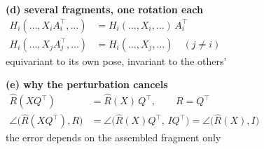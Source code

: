 \documentclass[border=6pt, varwidth=16.2cm]{standalone}
\begin{document}
\vspace{12pt}
\begin{minipage}[t]{7.9cm}\centering
  \textbf{(d) several fragments, one rotation each}\\[8pt]
  {\small $\begin{aligned}
    H_i(\ldots,X_iA_i^{\top},\ldots)&=H_i(\ldots,X_i,\ldots)\,A_i^{\top}\\[2pt]
    H_i(\ldots,X_jA_j^{\top},\ldots)&=H_i(\ldots,X_j,\ldots)\quad(j\ne i)
  \end{aligned}$}\\[5pt]
  {\footnotesize equivariant to its own pose, invariant to the others'}
\end{minipage}\hfill
\begin{minipage}[t]{7.9cm}\centering
  \textbf{(e) why the perturbation cancels}\\[8pt]
  {\small $\begin{aligned}
    \hat R(XQ^{\top})&=\hat R(X)\,Q^{\top},\qquad R=Q^{\top}\\[2pt]
    \angle\big(\hat R(XQ^{\top}),R\big)&=\angle\big(\hat R(X)Q^{\top},\,IQ^{\top}\big)=\angle\big(\hat R(X),I\big)
  \end{aligned}$}\\[5pt]
  {\footnotesize the error depends on the assembled fragment only}
\end{minipage}
\end{document}

